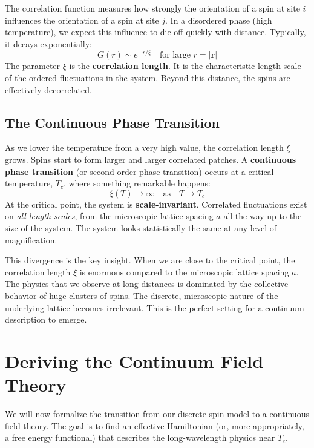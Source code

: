 \documentclass[11pt, a4paper, article]{article}
\renewcommand{\vec}[1]{\bm{#1}} %
\begin{document}
The correlation function measures how strongly the orientation of a spin at site $i$ influences the orientation of a spin at site $j$. In a disordered phase (high temperature), we expect this influence to die off quickly with distance. Typically, it decays exponentially:
\begin{equation}
    G(r) \sim e^{-r/\xi} \quad \text{for large } r = |\vec{r}|
\end{equation}
The parameter $\xi$ is the \textbf{correlation length}. It is the characteristic length scale of the ordered fluctuations in the system. Beyond this distance, the spins are effectively decorrelated.

\subsection{The Continuous Phase Transition}
As we lower the temperature from a very high value, the correlation length $\xi$ grows. Spins start to form larger and larger correlated patches. A \textbf{continuous phase transition} (or second-order phase transition) occurs at a critical temperature, $T_c$, where something remarkable happens:
\begin{equation}
    \xi(T) \to \infty \quad \text{as} \quad T \to T_c
\end{equation}
At the critical point, the system is \textbf{scale-invariant}. Correlated fluctuations exist on \textit{all length scales}, from the microscopic lattice spacing $a$ all the way up to the size of the system. The system looks statistically the same at any level of magnification.



This divergence is the key insight. When we are close to the critical point, the correlation length $\xi$ is enormous compared to the microscopic lattice spacing $a$. The physics that we observe at long distances is dominated by the collective behavior of huge clusters of spins. The discrete, microscopic nature of the underlying lattice becomes irrelevant. This is the perfect setting for a continuum description to emerge.

\newpage
\section{Deriving the Continuum Field Theory}

We will now formalize the transition from our discrete spin model to a continuous field theory. The goal is to find an effective Hamiltonian (or, more appropriately, a free energy functional) that describes the long-wavelength physics near $T_c$.
\end{document}
